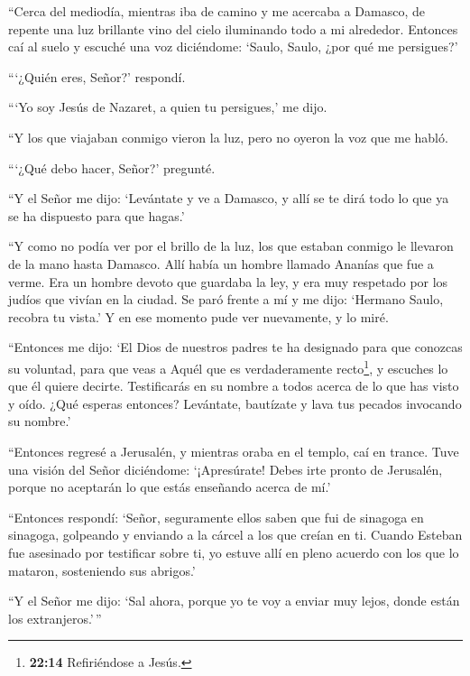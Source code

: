  ``Cerca del mediodía, mientras iba de camino y me acercaba
a Damasco, de repente una luz brillante vino del cielo iluminando todo a
mi alrededor.  Entonces caí al suelo y escuché una voz
diciéndome: `Saulo, Saulo, ¿por qué me persigues?'

 ```¿Quién eres, Señor?' respondí.

```Yo soy Jesús de Nazaret, a quien tu persigues,' me dijo.

 ``Y los que viajaban conmigo vieron la luz, pero no oyeron
la voz que me habló.

 ```¿Qué debo hacer, Señor?' pregunté.

``Y el Señor me dijo: `Levántate y ve a Damasco, y allí se te dirá todo
lo que ya se ha dispuesto para que hagas.'

 ``Y como no podía ver por el brillo de la luz, los que
estaban conmigo le llevaron de la mano hasta Damasco.  Allí
había un hombre llamado Ananías que fue a verme. Era un hombre devoto
que guardaba la ley, y era muy respetado por los judíos que vivían en la
ciudad.  Se paró frente a mí y me dijo: `Hermano Saulo,
recobra tu vista.' Y en ese momento pude ver nuevamente, y lo miré.

 ``Entonces me dijo: `El Dios de nuestros padres te ha
designado para que conozcas su voluntad, para que veas a Aquél que es
verdaderamente recto\footnote{\textbf{22:14} Refiriéndose a Jesús.}, y
escuches lo que él quiere decirte.  Testificarás en su
nombre a todos acerca de lo que has visto y oído. ¿Qué esperas entonces?
 Levántate, bautízate y lava tus pecados invocando su
nombre.'

 ``Entonces regresé a Jerusalén, y mientras oraba en el
templo, caí en trance.  Tuve una visión del Señor
diciéndome: `¡Apresúrate! Debes irte pronto de Jerusalén, porque no
aceptarán lo que estás enseñando acerca de mí.'

 ``Entonces respondí: `Señor, seguramente ellos saben que
fui de sinagoga en sinagoga, golpeando y enviando a la cárcel a los que
creían en ti.  Cuando Esteban fue asesinado por testificar
sobre ti, yo estuve allí en pleno acuerdo con los que lo mataron,
sosteniendo sus abrigos.'

 ``Y el Señor me dijo: `Sal ahora, porque yo te voy a
enviar muy lejos, donde están los extranjeros.'\,''

